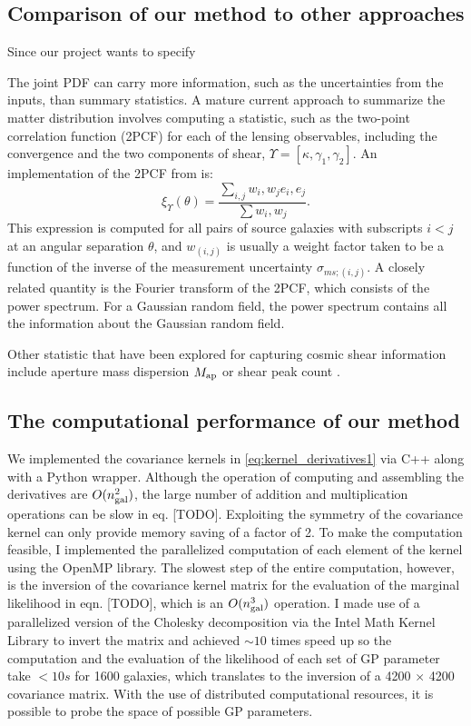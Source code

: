 \subsection{Comparison of our method to other approaches}
  Since our project wants to specify 

The joint PDF can carry more information,
such as the uncertainties from the inputs, 
than summary statistics. 
A mature current approach to summarize the matter distribution 
involves computing a statistic, such
as the two-point correlation function (2PCF) for each of the lensing
observables, including the convergence and the two components of shear, 
$\Upsilon = [\kappa, \gamma_1, \gamma_2]$. 
An implementation of the 2PCF from \cite{Jee2013a} is: 
\begin{equation}
	\xi_\Upsilon(\theta) = \frac{\sum_{i,j}w_i, w_j e_i, e_j}{\sum w_i, w_j}.
	\label{eqn:2PCF}
\end{equation}
This expression is computed 
for all pairs of source galaxies with subscripts $i < j$ at an angular separation 
$\theta$, and $w_{(i, j)}$ is usually
a weight factor taken to be a function of 
the inverse of the measurement uncertainty $\sigma_{ms; (i, j)}$.  
A closely related quantity is the Fourier transform of the 2PCF, which consists
of the power spectrum. For a Gaussian random field, the power spectrum contains
all the information about the Gaussian random field. 

Other statistic that have been explored for capturing cosmic shear information
include aperture mass dispersion $M_{\rm ap}$ or shear peak count \citep{Bard2014}.


\subsection{The computational performance of our method}
We implemented the covariance kernels in \ref{eq:kernel_derivatives1}
via {\sc C++} along with a {\sc Python} wrapper. 
Although the operation of computing and assembling the
derivatives are $O(n_{\rm gal}^2)$, the large number of addition and 
multiplication operations can be slow in eq. [TODO].
Exploiting the symmetry of the covariance kernel can only provide 
memory saving of a factor of 2.
To make the computation feasible, 
I implemented the parallelized computation of each element of the kernel using 
the {\sc OpenMP} library. The slowest step of the entire computation, however, 
is the inversion of the
covariance kernel matrix for the evaluation of the marginal likelihood in eqn.
[TODO], 
which is an $O(n_{\rm gal}^3)$ operation. 
I made use of a parallelized version of the Cholesky decomposition via the {\sc Intel Math
Kernel Library} to invert the matrix and achieved $\sim10$ 
times speed up so the
computation and the evaluation of the likelihood of each set of GP parameter
take $< 10s$ for 1600 galaxies, which translates to 
the inversion of a 4200 $\times$ 4200 covariance matrix.
With the use of distributed computational resources, it is possible 
to probe the space of possible GP parameters.  

